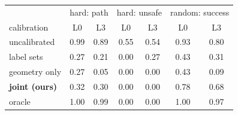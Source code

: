 \begin{tabular}{l|cc|cc|cc}
\toprule
 & \multicolumn{2}{c|}{hard: path} & \multicolumn{2}{c|}{hard: unsafe} & \multicolumn{2}{c}{random: success} \\
calibration & L0 & L3 & L0 & L3 & L0 & L3 \\
\midrule
uncalibrated & 0.99 & 0.89 & 0.55 & 0.54 & 0.93 & 0.80 \\
label sets~\cite{sundarsingh} & 0.27 & 0.21 & 0.00 & 0.27 & 0.43 & 0.31 \\
geometry only & 0.27 & 0.05 & 0.00 & 0.00 & 0.43 & 0.09 \\
\textbf{joint (ours)} & 0.32 & 0.30 & 0.00 & 0.00 & 0.78 & 0.68 \\
oracle & 1.00 & 0.99 & 0.00 & 0.00 & 1.00 & 0.97 \\
\bottomrule
\end{tabular}
